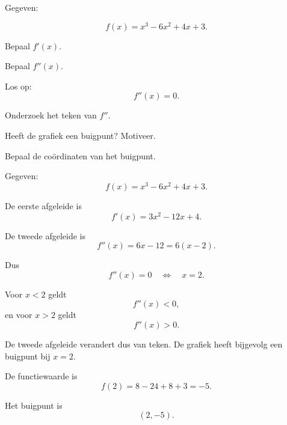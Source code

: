 \documentclass{ximera}
\begin{document}
\begin{oefening}{\oefB\ESS}

Gegeven:

\[
f(x)=x^3-6x^2+4x+3.
\]

\begin{question}
Bepaal $f'(x)$.
\end{question}

\begin{question}
Bepaal $f''(x)$.
\end{question}

\begin{question}
Los op:
\[
f''(x)=0.
\]
\end{question}

\begin{question}
Onderzoek het teken van $f''$.
\end{question}

\begin{question}
Heeft de grafiek een buigpunt?
Motiveer.
\end{question}

\begin{question}
Bepaal de coördinaten van het buigpunt.
\end{question}

\begin{oplossing}

Gegeven:
\[
f(x)=x^3-6x^2+4x+3.
\]

De eerste afgeleide is
\[
f'(x)=3x^2-12x+4.
\]

De tweede afgeleide is
\[
f''(x)=6x-12=6(x-2).
\]

Dus
\[
f''(x)=0
\quad\Longleftrightarrow\quad
x=2.
\]

Voor $x<2$ geldt
\[
f''(x)<0,
\]
en voor $x>2$ geldt
\[
f''(x)>0.
\]

De tweede afgeleide verandert dus van teken. De grafiek heeft bijgevolg
een buigpunt bij $x=2$.

De functiewaarde is
\[
f(2)=8-24+8+3=-5.
\]

Het buigpunt is
\[
\boxed{(2,-5)}.
\]

\end{oplossing}

\end{oefening}


\end{document}

